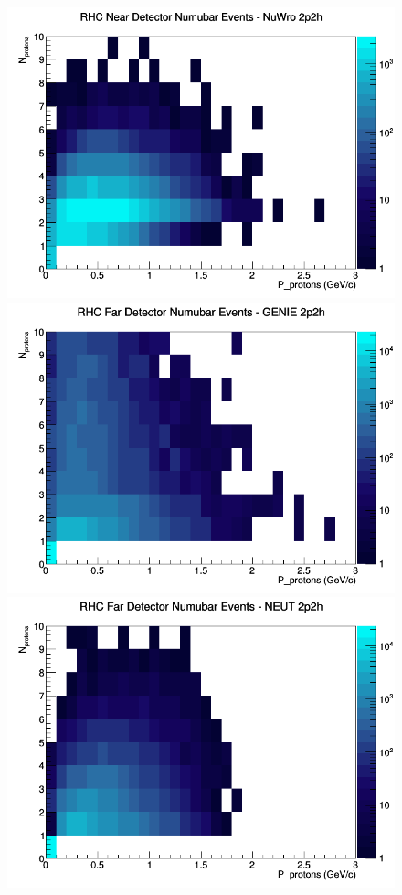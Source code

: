 \documentclass[12pt]{article}
\begin{document}
\begin{figure}[h]
\includegraphics[width=\linewidth]{N_P/nominal/protons/2p2h_RHC_ND_numubar_N_P_NuWro.png}
\endminipage
\newline
{}
\includegraphics[width=\linewidth]{N_P/nominal/protons/2p2h_RHC_FD_numubar_N_P_GENIE.png}
\endminipage
{}
\includegraphics[width=\linewidth]{N_P/nominal/protons/2p2h_RHC_FD_numubar_N_P_NEUT.png}

\end{figure}
\end{document}

